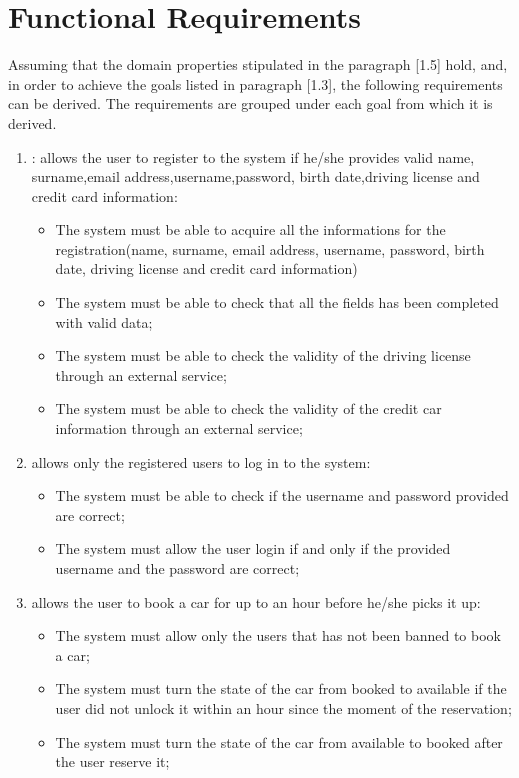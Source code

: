 \section{Functional Requirements}
Assuming that the domain properties stipulated in the paragraph [1.5] hold, and, in order to achieve the goals listed in paragraph [1.3], the following requirements can be derived. The requirements are grouped under each goal from which it is derived.

\begin{enumerate}

\item: allows the user to register to the system if he/she provides valid name, surname,email address,username,password, birth date,driving license and credit card information:

\begin{itemize}
	\item The system must be able to acquire all the informations for the registration(name, surname, email address, username, password, birth date, driving license and credit card information)
	\item The system must be able to check that all the fields has been completed with valid data;
	\item The system must be able to check the validity of the driving license through an external service;
	\item The system must be able to check the validity of the credit car information through an external service;
\end{itemize}

\item allows only the registered users to log in to the system:

\begin{itemize}
	\item The system must be able to check if the username and password provided are correct;
	\item The system must allow the user login if and only if the provided username and the password are correct;
\end{itemize}

\item allows the user to book a car for up to an hour before he/she picks it up:

\begin{itemize}
	\item The system must allow only the users that has not been banned to book a car;
	\item The system must turn the state of the car from booked to available if the user did not unlock it within an hour since the moment of the reservation;
	\item The system must turn the state of the car from available to booked after the user reserve it;
\end{itemize}


\end{enumerate}
